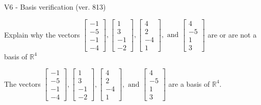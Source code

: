\begin{exercise}
  \begin{exerciseTitle}V6 - Basis verification (ver. 813)\end{exerciseTitle}
  \begin{exerciseStatement}
    Explain why the vectors \(\left[\begin{array}{r}
-1 \\
-5 \\
-1 \\
-4
\end{array}\right] , \left[\begin{array}{r}
1 \\
3 \\
-1 \\
-2
\end{array}\right] , \left[\begin{array}{r}
4 \\
2 \\
-4 \\
1
\end{array}\right] , \text{ and } \left[\begin{array}{r}
4 \\
-5 \\
1 \\
3
\end{array}\right]\) are or are not a basis of \(\mathbb{R}^4\)	


  \end{exerciseStatement}
  \begin{exerciseAnswer}
   The vectors \(\left[\begin{array}{r}
-1 \\
-5 \\
-1 \\
-4
\end{array}\right] , \left[\begin{array}{r}
1 \\
3 \\
-1 \\
-2
\end{array}\right] , \left[\begin{array}{r}
4 \\
2 \\
-4 \\
1
\end{array}\right] , \text{ and } \left[\begin{array}{r}
4 \\
-5 \\
1 \\
3
\end{array}\right]\) 
  	 are  a basis of \(\mathbb{R}^4\).
  


  \end{exerciseAnswer}
\end{exercise}